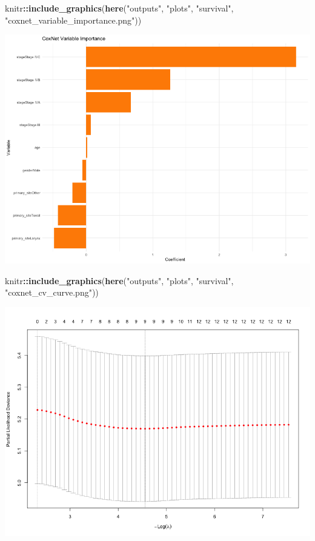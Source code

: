 \documentclass[
  11pt,
]{article}
\newenvironment{Shaded}{\begin{snugshade}}{\end{snugshade}}
\newcommand{\FunctionTok}[1]{\textcolor[rgb]{0.13,0.29,0.53}{\textbf{#1}}}
\newcommand{\NormalTok}[1]{#1}
\newcommand{\SpecialCharTok}[1]{\textcolor[rgb]{0.81,0.36,0.00}{\textbf{#1}}}
\newcommand{\StringTok}[1]{\textcolor[rgb]{0.31,0.60,0.02}{#1}}
\begin{document}
\begin{Shaded}
\begin{Highlighting}[]
\NormalTok{knitr}\SpecialCharTok{::}\FunctionTok{include\_graphics}\NormalTok{(}\FunctionTok{here}\NormalTok{(}\StringTok{"outputs"}\NormalTok{, }\StringTok{"plots"}\NormalTok{, }\StringTok{"survival"}\NormalTok{, }\StringTok{"coxnet\_variable\_importance.png"}\NormalTok{))}
\end{Highlighting}
\end{Shaded}

\includegraphics[width=0.8\linewidth]{../outputs/plots/survival/coxnet_variable_importance}

\begin{Shaded}
\begin{Highlighting}[]
\NormalTok{knitr}\SpecialCharTok{::}\FunctionTok{include\_graphics}\NormalTok{(}\FunctionTok{here}\NormalTok{(}\StringTok{"outputs"}\NormalTok{, }\StringTok{"plots"}\NormalTok{, }\StringTok{"survival"}\NormalTok{, }\StringTok{"coxnet\_cv\_curve.png"}\NormalTok{))}
\end{Highlighting}
\end{Shaded}

\includegraphics[width=0.8\linewidth]{../outputs/plots/survival/coxnet_cv_curve}
\end{document}
